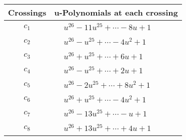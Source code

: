 \documentclass[1p]{elsarticle_modified}
\theoremstyle{definition}
\begin{document}
\begin{tabular}{m{50pt}|m{274pt}}
Crossings & \hspace{64pt}u-Polynomials at each crossing \\
\hline $$\begin{aligned}c_{1}\end{aligned}$$&$\begin{aligned}
&u^{26}-11 u^{25}+\cdots-8 u+1
\end{aligned}$\\
\hline $$\begin{aligned}c_{2}\end{aligned}$$&$\begin{aligned}
&u^{26}- u^{25}+\cdots-4 u^2+1
\end{aligned}$\\
\hline $$\begin{aligned}c_{3}\end{aligned}$$&$\begin{aligned}
&u^{26}+u^{25}+\cdots+6 u+1
\end{aligned}$\\
\hline $$\begin{aligned}c_{4}\end{aligned}$$&$\begin{aligned}
&u^{26}- u^{25}+\cdots+2 u+1
\end{aligned}$\\
\hline $$\begin{aligned}c_{5}\end{aligned}$$&$\begin{aligned}
&u^{26}-2 u^{25}+\cdots+8 u^2+1
\end{aligned}$\\
\hline $$\begin{aligned}c_{6}\end{aligned}$$&$\begin{aligned}
&u^{26}+u^{25}+\cdots-4 u^2+1
\end{aligned}$\\
\hline $$\begin{aligned}c_{7}\end{aligned}$$&$\begin{aligned}
&u^{26}-13 u^{25}+\cdots- u+1
\end{aligned}$\\
\hline $$\begin{aligned}c_{8}\end{aligned}$$&$\begin{aligned}
&u^{26}+13 u^{25}+\cdots+4 u+1
\end{aligned}$\\

\end{tabular}
\end{document}
